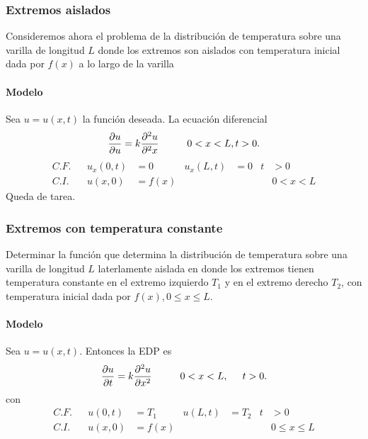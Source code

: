 \documentclass[11pt,letterpaper]{report}
\newcommand\<{\langle}
\renewcommand\>{\rangle}
\begin{document}
\subsubsection{Extremos aislados}
Consideremos ahora el problema de la distribución de temperatura
sobre una varilla de longitud $L$ donde los extremos son aislados
con temperatura inicial dada por $f(x)$ a lo largo de la varilla

\paragraph{Modelo}
Sea $u=u(x,t)$ la función deseada. La ecuación diferencial
\[
  \frac{\partial u}{\partial u}
  =k
  \frac{\partial^2u}{\partial^2x}
  \hspace{10mm} 0<x<L, t>0
.\]
\begin{align*}
  C.F. && u_x(0,t) &= 0 & u_x(L,t) &= 0 &t&>0 \\
  C.I. && u(x,0) &= f(x) & &&& 0<x<L
\end{align*}
Queda de tarea.

\subsubsection{Extremos con temperatura constante}

Determinar la función que determina la distribución de
temperatura sobre una varilla de longitud $L$ laterlamente
aislada en donde los extremos tienen temperatura constante en el
extremo izquierdo $T_1$ y en el extremo derecho $T_2$, con
temperatura inicial dada por $f(x), 0\leq x\leq L$.

\paragraph{Modelo}
Sea $u=u(x,t)$. Entonces la EDP es
\[
  \frac{\partial u}{\partial t}
  = k
  \frac{\partial ^2 u}{\partial x^2}
  \hspace{10mm} 0<x<L,
  \hspace{5mm} t>0.
\]
con
\begin{align*}
  C.F. && u(0,t) &= T_1 & u(L,t) &= T_2 &t&>0 \\
  C.I. && u(x,0) &= f(x) & &&& 0\leq x\leq L
\end{align*}
\end{document}
